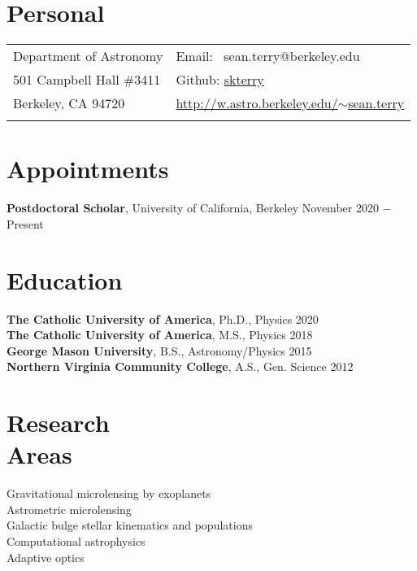 \documentclass[margin,line]{res}
\begin{document}

\begin{resume}
\section{\sc Personal}

\vspace{.05in}
\begin{tabular}{@{}p{3.5in}p{3in}}
Department of Astronomy      & Email: \,\,\,sean.terry@berkeley.edu \\
501 Campbell Hall \#3411       &  Github: \hyperlink{https://github.com/skterry}{skterry} \\
Berkeley, CA 94720       & \hyperlink{http://w.astro.berkeley.edu/~sean.terry}{http://w.astro.berkeley.edu/$\sim$sean.terry}\\
 \\
\end{tabular}

\section{\sc Appointments}
{\bf Postdoctoral Scholar}, University of California, Berkeley  \hfill      {November 2020 $-$ Present}\\


\section{\sc Education}
{\bf The Catholic University of America}, Ph.D., Physics  \hfill 2020\\
{\bf The Catholic University of America}, M.S., Physics  \hfill 2018\\
{\bf George Mason University}, B.S., Astronomy/Physics \hfill 2015\\
{\bf Northern Virginia Community College}, A.S., Gen. Science \hfill 2012\\

\section{\sc Research\\ Areas}
Gravitational microlensing by exoplanets  \\
Astrometric microlensing \\
Galactic bulge stellar kinematics and populations  \\
Computational astrophysics \\
Adaptive optics \\



\end{resume}
\end{document}
